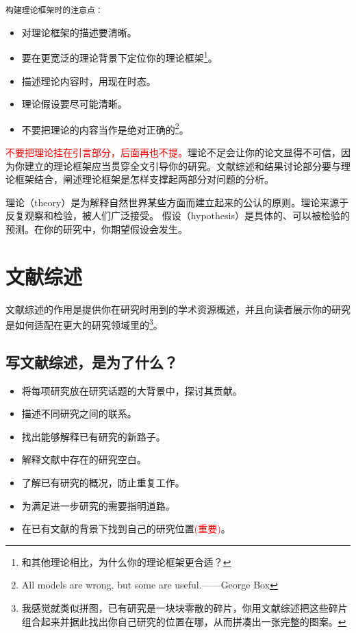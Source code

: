 \documentclass[cn,hazy,blue,14pt,screen]{elegantnote} %
\begin{document}
\lstinline{构建理论框架时的注意点：}

\begin{itemize}
  \item 对理论框架的描述要清晰。
  \item 要在更宽泛的理论背景下定位你的理论框架\footnote{和其他理论相比，为什么你的理论框架更合适？}。
  \item 描述理论内容时，用现在时态。
  \item 理论假设要尽可能清晰。
  \item 不要把理论的内容当作是绝对正确的\footnote{All models are wrong, but some are useful.——George Box}。
\end{itemize}

\textcolor{red}{不要把理论挂在引言部分，后面再也不提。}理论不足会让你的论文显得不可信，因为你建立的理论框架应当贯穿全文引导你的研究。文献综述和结果讨论部分要与理论框架结合，阐述理论框架是怎样支撑起两部分对问题的分析。

\begin{tcolorbox}[colback=red!5!white,colframe=red!75!black,title=Theory和Hypothesis的区别]
  理论（theory）是为解释自然世界某些方面而建立起来的公认的原则。理论来源于反复观察和检验，被人们广泛接受。
  \tcblower
  假设（hypothesis）是具体的、可以被检验的预测。在你的研究中，你期望假设会发生。
  \end{tcolorbox}

\newpage

\section{文献综述}

文献综述的作用是提供你在研究时用到的学术资源概述，并且向读者展示你的研究是如何适配在更大的研究领域里的\footnote{我感觉就类似拼图，已有研究是一块块零散的碎片，你用文献综述把这些碎片组合起来并据此找出你自己研究的位置在哪，从而拼凑出一张完整的图案。}。

\subsection{写文献综述，是为了什么？}

\begin{itemize}
  \item 将每项研究放在研究话题的大背景中，探讨其贡献。
  \item 描述不同研究之间的联系。
  \item 找出能够解释已有研究的新路子。
  \item 解释文献中存在的研究空白。
  \item 了解已有研究的概况，防止重复工作。
  \item 为满足进一步研究的需要指明道路。
  \item 在已有文献的背景下找到自己的研究位置\textcolor{red}{(重要)}。
\end{itemize}
\end{document}
